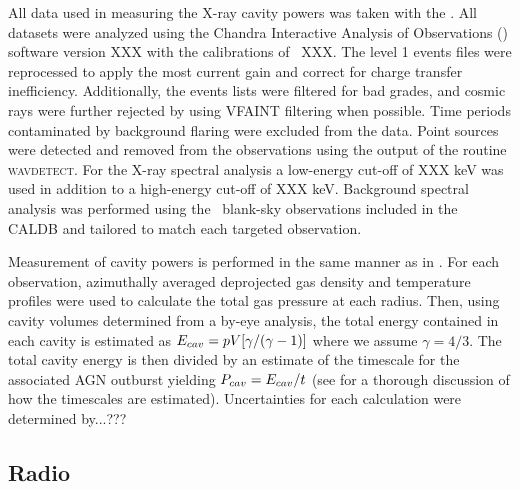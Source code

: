\documentclass{emulateapj}
\begin{document}
All data used in measuring the X-ray cavity powers was taken with the
\cxo. All datasets were analyzed using the Chandra Interactive
Analysis of Observations (\ciao) software version XXX with the
calibrations of \caldb\ XXX. The level 1 events files were reprocessed
to apply the most current gain and correct for charge transfer
inefficiency. Additionally, the events lists were filtered for bad
grades, and cosmic rays were further rejected by using VFAINT
filtering when possible. Time periods contaminated by background
flaring were excluded from the data. Point sources were detected and
removed from the observations using the output of the routine
{\textsc{wavdetect}}. For the X-ray spectral analysis a low-energy
cut-off of XXX keV was used in addition to a high-energy cut-off of
XXX keV. Background spectral analysis was performed using the
\caldb\ blank-sky observations included in the CALDB and tailored to
match each targeted observation.

Measurement of cavity powers is performed in the same manner as in
\citet{birzan04, birzan08}. For each observation, azimuthally averaged
deprojected gas density and temperature profiles were used to
calculate the total gas pressure at each radius. Then, using cavity
volumes determined from a by-eye analysis, the total energy contained
in each cavity is estimated as $E_{cav} = pV[\gamma/(\gamma-1)]$ where
we assume $\gamma = 4/3$. The total cavity energy is then divided by
an estimate of the timescale for the associated AGN outburst yielding
$P_{cav} = E_{cav}/t$ (see \citet{mcnamrev} for a thorough discussion of
how the timescales are estimated). Uncertainties for each calculation
were determined by...???

\subsection{Radio}
\label{sec:radio}
\end{document}

